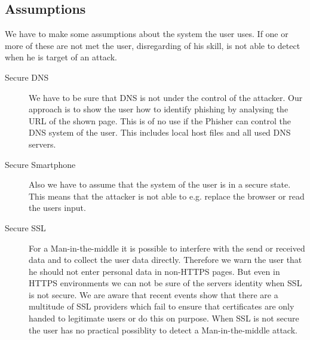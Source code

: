 \subsection{Assumptions}
We have to make some assumptions about the system the user uses. If one or more of these are not met the user, disregarding of his skill, is not able to detect when he is target of an attack.
\begin{description}
	\item[Secure DNS] We have to be sure that DNS is not under the control of the attacker.
	Our approach is to show the user how to identify phishing by analysing the URL of the shown page.
	This is of no use if the Phisher can control the DNS system of the user.
	This includes local host files and all used DNS servers.
	\item[Secure Smartphone] Also we have to assume that the system of the user is in a secure state.
	This means that the attacker is not able to e.g. replace the browser or read the users input.
	\item[Secure SSL] 
	For a Man-in-the-middle it is possible to interfere with the send or received data and to collect the user data directly.
	Therefore we warn the user that he should not enter personal data in non-HTTPS pages.
	But even in HTTPS environments we can not be sure of the servers identity when SSL is not secure.
	We are aware that recent events show that there are a multitude of SSL providers which fail to ensure that certificates are only handed to legitimate users or do this on purpose.
	When SSL is not secure the user has no practical possiblity to detect a Man-in-the-middle attack.		
\end{description}

